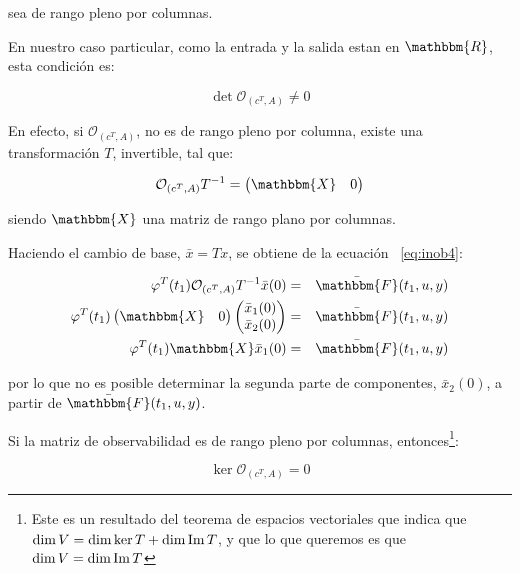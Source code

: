		sea de rango pleno por columnas.

		En nuestro caso particular, como la entrada y la salida estan en $\mathbbm{R}$, esta condición es:

		\begin{equation*}
			\det{\mathcal{O}_{(c^T, A)}} \ne 0
		\end{equation*}

		En efecto, si $\mathcal{O}_{(c^T, A)}$, no es de rango pleno por columna, existe una transformación $T$, invertible, tal que:

		\begin{equation*}
			\mathcal{O}_{(c^T, A)} T^{-1} =
			\begin{pmatrix}
				\mathbbm{X} & 0
			\end{pmatrix}
		\end{equation*}

		siendo $\mathbbm{X}$ una matriz de rango plano por columnas.

		Haciendo el cambio de base, $\bar{x} = T x$, se obtiene de la ecuación ~\ref{eq:inob4}:

		\begin{eqnarray*}
			\varphi^T(t_1) \mathcal{O}_{(c^T, A)} T^{-1} \bar{x}(0) & = & \bar{\mathbbm{F}}(t_1, u, y) \\
			\varphi^T(t_1)
			\begin{pmatrix}
			 	\mathbbm{X} & 0
			\end{pmatrix}
			\begin{pmatrix}
			 	\bar{x}_1(0) \\
			 	\bar{x}_2(0)
			\end{pmatrix} & = & \bar{\mathbbm{F}}(t_1, u, y) \\
			\varphi^T(t_1) \mathbbm{X} \bar{x}_1(0) & = & \bar{\mathbbm{F}}(t_1, u, y)
		\end{eqnarray*}

		por lo que no es posible determinar la segunda parte de componentes, $\bar{x}_2(0)$, a partir de $\bar{\mathbbm{F}}(t_1, u, y)$.

		Si la matriz de observabilidad es de rango pleno por columnas, entonces\footnote{Este es un resultado del teorema de espacios vectoriales que indica que $\dim{V} = \dim{\ker{T}} + \dim{\operatorname{Im}{T}}$, y que lo que queremos es que $\dim{V} = \dim{\operatorname{Im}{T}}$}:

		\begin{equation*}
			\ker{\mathcal{O}_{(c^T, A)}} = {0}
		\end{equation*}

